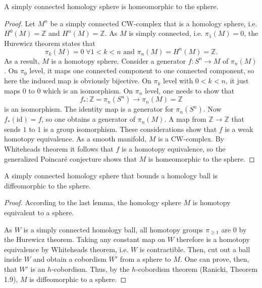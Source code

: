 \begin{lemma}
    A simply connected homology sphere is homeomorphic to the sphere.
\end{lemma}
\begin{proof}
    Let $M^n$ be a simply connected CW-complex that is a homology sphere, i.e. $H^0(M) = \mathbb Z$ and $H^n(M) = \mathbb Z$. 
    As $M$ is simply connected, i.e. $\pi_1(M) = 0$, the Hurewicz theorem states that
    \[
    \pi_k(M) = 0 \; \forall 1 < k < n\text{ and }\pi_n(M) = H^n(M) = \mathbb Z.
    \]
    As a result, $M$ is a homotopy sphere.
    Consider a generator $f: S^n \to M$ of $\pi_n(M)$.
    On $\pi_0$ level, it maps one connected component to one connected component, so here the induced map is obviously bijective.
    On $\pi_k$ level with $0 < k < n$, it just maps $0$ to $0$ which is an isomorphism.
    On $\pi_n$ level, one needs to show that 
    \[
        f_*: \mathbb Z = \pi_n(S^n) \to \pi_n(M) = \mathbb Z 
    \]
    is an isomorphism. The identity map is a generator for $\pi_n(S^n)$. Now $f_*(\mathrm{id}) = f$, so one obtains a generator of $\pi_n(M)$. 
    A map from $\mathbb Z \to \mathbb Z$ that sends $1$ to $1$ is a group isomorphism. These considerations show that $f$ is a weak homotopy equivalence.
    As a smooth manifold, $M$ is a CW-complex. By Whiteheads theorem it follows that $f$ is a homotopy equivalence, so the generalized Poincar\'e conjecture 
    shows that $M$ is homeomorphic to the sphere.
\end{proof}

\begin{lemma}
    A simply connected homology sphere that bounds a homology ball is diffeomorphic to the sphere.
\end{lemma}
\begin{proof}
    According to the last lemma, the homology sphere $M$ is homotopy equivalent to a sphere.

    As $W$ is a simply connected homology ball, all homotopy groups $\pi_{\ge 1}$ are 0 by the Hurewicz theorem.
    Taking any constant map on $W$ therefore is a homotopy equivalence by Whiteheads theorem, i.e. $W$ is contractible. 
    Then, cut out a ball inside $W$ and obtain a cobordism $W'$ from a sphere to $M$.
    One can prove, then, that $W'$ is an $h$-cobordism.
    Thus, by the $h$-cobordism theorem (Ranicki, Theorem 1.9), $M$ is diffeomorphic to a sphere.
\end{proof}